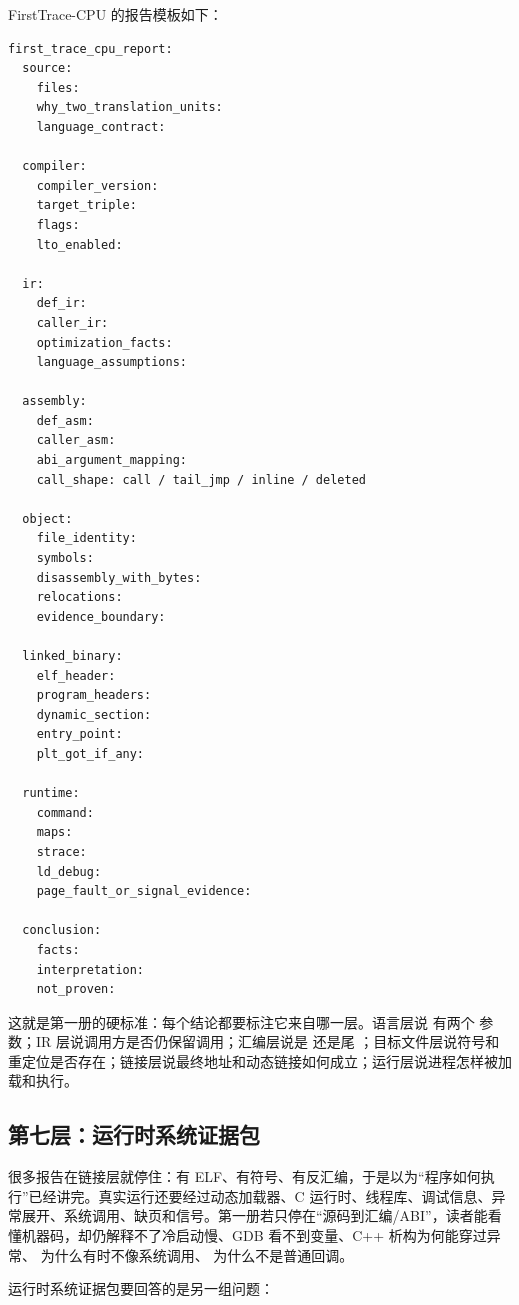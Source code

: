 FirstTrace-CPU 的报告模板如下：

\begin{lstlisting}[numbers=none,caption={FirstTrace-CPU 报告模板}]
first_trace_cpu_report:
  source:
    files:
    why_two_translation_units:
    language_contract:

  compiler:
    compiler_version:
    target_triple:
    flags:
    lto_enabled:

  ir:
    def_ir:
    caller_ir:
    optimization_facts:
    language_assumptions:

  assembly:
    def_asm:
    caller_asm:
    abi_argument_mapping:
    call_shape: call / tail_jmp / inline / deleted

  object:
    file_identity:
    symbols:
    disassembly_with_bytes:
    relocations:
    evidence_boundary:

  linked_binary:
    elf_header:
    program_headers:
    dynamic_section:
    entry_point:
    plt_got_if_any:

  runtime:
    command:
    maps:
    strace:
    ld_debug:
    page_fault_or_signal_evidence:

  conclusion:
    facts:
    interpretation:
    not_proven:
\end{lstlisting}

这就是第一册的硬标准：每个结论都要标注它来自哪一层。语言层说  有两个  参数；IR 层说调用方是否仍保留调用；汇编层说是  还是尾 ；目标文件层说符号和重定位是否存在；链接层说最终地址和动态链接如何成立；运行层说进程怎样被加载和执行。

\subsection{第七层：运行时系统证据包}

很多报告在链接层就停住：有 ELF、有符号、有反汇编，于是以为“程序如何执行”已经讲完。真实运行还要经过动态加载器、C 运行时、线程库、调试信息、异常展开、系统调用、缺页和信号。第一册若只停在“源码到汇编/ABI”，读者能看懂机器码，却仍解释不了冷启动慢、GDB 看不到变量、C++ 析构为何能穿过异常、 为什么有时不像系统调用、 为什么不是普通回调。

运行时系统证据包要回答的是另一组问题：

